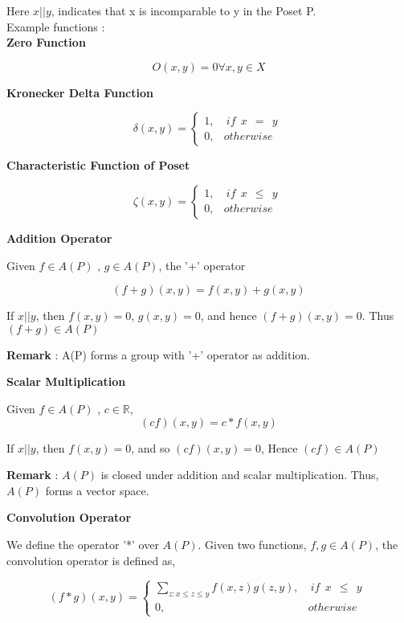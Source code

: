 Here $x || y$, indicates that x is incomparable to y in the Poset P. \\

Example functions : \\

\textbf{Zero Function} 

$$ O(x,y) = 0 \forall x,y \in X $$

\textbf{Kronecker Delta Function}

$$ \delta(x,y) =  \begin{cases} 
	1 , &  ~if~ ~x~ ~=~ ~y~ \\
	0 , & otherwise
	\end{cases} $$

\textbf{Characteristic Function of Poset}

$$ \zeta(x,y) =  \begin{cases} 
	1 , &  ~if~ ~x~ ~\le~ ~y~ \\
	0 , & otherwise
	\end{cases} $$

\medskip

\textbf{Addition Operator}

Given $f \in A(P)$ , $g \in A(P)$, the '+' operator

$$ (f+g) (x,y) = f(x,y) + g(x,y) $$

If $x || y$, then $f(x,y) = 0$, $g(x,y) = 0$, and hence $(f+g)(x,y) = 0$.
Thus $(f+g) \in A(P)$

\textbf{Remark} : A(P) forms a group with '+' operator as addition.

\medskip
\textbf{Scalar Multiplication}

Given $f \in A(P)$ , $c \in \mathbb{R}$,
$$ (cf)(x,y) = c*f(x,y)$$

If $x||y$, then $f(x,y) = 0$, and so $(cf)(x,y) = 0 $, Hence $(cf) \in A(P)$

\textbf{Remark} : $A(P)$ is closed under addition and scalar multiplication. Thus, $A(P)$ forms a vector space.

\medskip

\textbf{Convolution Operator}

We define the operator '*' over $A(P)$. Given two functions, 
$f,g \in A(P)$, the convolution operator is defined as,

$$ (f*g)(x,y) = \begin{cases} 
	\sum_{z:x\le z \le y} f(x,z)g(z,y), &  ~if~ ~x~ ~\le~ ~y~ \\
	0 , & otherwise
	\end{cases} $$
	

